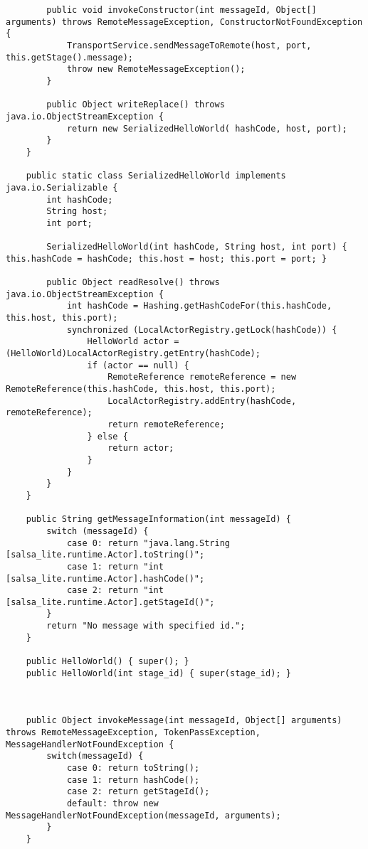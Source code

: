 \documentclass[12pt]{article}
\begin{document}
\begin{lstlisting}
        public void invokeConstructor(int messageId, Object[] arguments) throws RemoteMessageException, ConstructorNotFoundException {
            TransportService.sendMessageToRemote(host, port, this.getStage().message);
            throw new RemoteMessageException();
        }

        public Object writeReplace() throws java.io.ObjectStreamException {
            return new SerializedHelloWorld( hashCode, host, port);
        }
    }

    public static class SerializedHelloWorld implements java.io.Serializable {
        int hashCode;
        String host;
        int port;

        SerializedHelloWorld(int hashCode, String host, int port) { this.hashCode = hashCode; this.host = host; this.port = port; }

        public Object readResolve() throws java.io.ObjectStreamException {
            int hashCode = Hashing.getHashCodeFor(this.hashCode, this.host, this.port);
            synchronized (LocalActorRegistry.getLock(hashCode)) {
                HelloWorld actor = (HelloWorld)LocalActorRegistry.getEntry(hashCode);
                if (actor == null) {
                    RemoteReference remoteReference = new RemoteReference(this.hashCode, this.host, this.port);
                    LocalActorRegistry.addEntry(hashCode, remoteReference);
                    return remoteReference;
                } else {
                    return actor;
                }
            }
        }
    }

    public String getMessageInformation(int messageId) {
    	switch (messageId) {
    		case 0: return "java.lang.String [salsa_lite.runtime.Actor].toString()";
    		case 1: return "int [salsa_lite.runtime.Actor].hashCode()";
    		case 2: return "int [salsa_lite.runtime.Actor].getStageId()";
    	}
    	return "No message with specified id.";
    }

    public HelloWorld() { super(); }
    public HelloWorld(int stage_id) { super(stage_id); }



    public Object invokeMessage(int messageId, Object[] arguments) throws RemoteMessageException, TokenPassException, MessageHandlerNotFoundException {
        switch(messageId) {
            case 0: return toString();
            case 1: return hashCode();
            case 2: return getStageId();
            default: throw new MessageHandlerNotFoundException(messageId, arguments);
        }
    }


\end{lstlisting}
\end{document}
